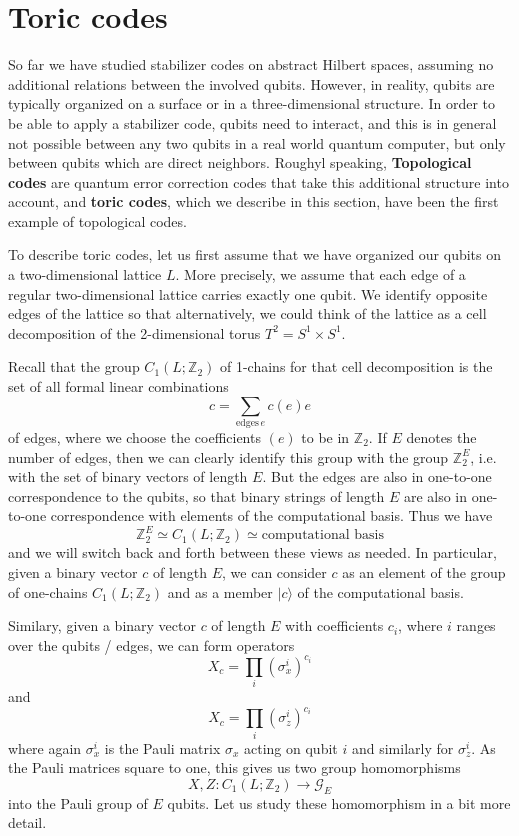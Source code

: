 \documentclass[a4paper, draft]{article}
\theoremstyle{own}
\theoremstyle{remark}
\newcommand{\Z}{\mathbb{Z}}
\begin{document}
\section{Toric codes}

So far we have studied stabilizer codes on abstract Hilbert spaces, assuming no additional relations between the involved qubits. However, in reality, qubits are typically organized on a surface or in a three-dimensional structure. In order to be able to apply a stabilizer code, qubits need to interact, and this is in general not possible between any two qubits in a real world quantum computer, but only between qubits which are direct neighbors. Roughyl speaking, {\bf Topological codes} are quantum error correction codes that take this additional structure into account, and {\bf toric codes}, which we describe in this section, have been the first example of topological codes.

To describe toric codes, let us first assume that we have organized our qubits on a two-dimensional lattice $L$. More precisely, we assume that each edge of a regular two-dimensional lattice carries exactly one qubit. We identify opposite edges of the lattice so that alternatively, we could think of the lattice as a cell decomposition of the 2-dimensional torus $T^2 = S^1 \times S^1$. 

Recall that the group $C_1(L;\Z_2)$ of 1-chains for that cell decomposition is the set of all formal linear combinations
$$
c = \sum_{\text{edges} \, e} c(e) e
$$
of edges, where we choose the coefficients $(e)$ to be in $\Z_2$. If $E$ denotes the number of edges, then we can clearly identify this group with the group $\Z_2^E$, i.e. with the set of binary vectors of length $E$. But the edges are also in one-to-one correspondence to the qubits, so that binary strings of length $E$ are also in one-to-one correspondence with elements of the computational basis. Thus we have
$$
\Z_2^E \simeq C_1(L ; \Z_2) \simeq \text{computational basis}
$$
and we will switch back and forth between these views as needed. In particular, given a binary vector $c$ of length $E$, we can consider $c$ as an element of the group of one-chains $C_1(L; \Z_2)$ and as a member $|c \rangle$ of the computational basis. 

Similary, given a binary vector $c$ of length $E$ with coefficients $c_i$, where $i$ ranges over the qubits / edges, we can form operators
$$
X_c = \prod_i (\sigma_{x}^i)^{c_i}
$$
and 
$$
X_c = \prod_i (\sigma_{z}^i)^{c_i}
$$
where again $\sigma_x^i$ is the Pauli matrix $\sigma_x$ acting on qubit $i$ and similarly for $\sigma_z^i$. As the Pauli matrices square to one, this gives us two group homomorphisms
$$
X, Z \colon C_1(L;\Z_2) \rightarrow \mathcal{G}_E
$$
into the Pauli group of $E$ qubits. Let us study these homomorphism in a bit more detail.
\end{document}
